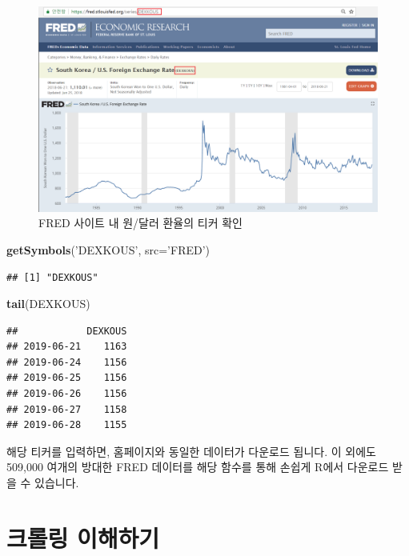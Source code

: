 \documentclass[12pt,]{book}
\newenvironment{Shaded}{\begin{snugshade}}{\end{snugshade}}
\newcommand{\DataTypeTok}[1]{\textcolor[rgb]{0.13,0.29,0.53}{#1}}
\newcommand{\KeywordTok}[1]{\textcolor[rgb]{0.13,0.29,0.53}{\textbf{#1}}}
\newcommand{\NormalTok}[1]{#1}
\newcommand{\StringTok}[1]{\textcolor[rgb]{0.31,0.60,0.02}{#1}}
\begin{document}
\begin{figure}[h]

{\centering \includegraphics[width=0.7\linewidth]{images/api_fred} 

}

\caption{FRED 사이트 내 원/달러 환율의 티커 확인}\label{fig:fred}
\end{figure}

\begin{Shaded}
\begin{Highlighting}[]
\KeywordTok{getSymbols}\NormalTok{(}\StringTok{'DEXKOUS'}\NormalTok{, }\DataTypeTok{src=}\StringTok{'FRED'}\NormalTok{)}
\end{Highlighting}
\end{Shaded}

\begin{verbatim}
## [1] "DEXKOUS"
\end{verbatim}

\begin{Shaded}
\begin{Highlighting}[]
\KeywordTok{tail}\NormalTok{(DEXKOUS)}
\end{Highlighting}
\end{Shaded}

\begin{verbatim}
##            DEXKOUS
## 2019-06-21    1163
## 2019-06-24    1156
## 2019-06-25    1156
## 2019-06-26    1156
## 2019-06-27    1158
## 2019-06-28    1155
\end{verbatim}

해당 티커를 입력하면, 홈페이지와 동일한 데이터가 다운로드 됩니다. 이 외에도 509,000 여개의 방대한 FRED 데이터를 해당 함수를 통해 손쉽게 R에서 다운로드 받을 수 있습니다.

\hypertarget{section-12}{%
\chapter{크롤링 이해하기}\label{section-12}}
\end{document}
